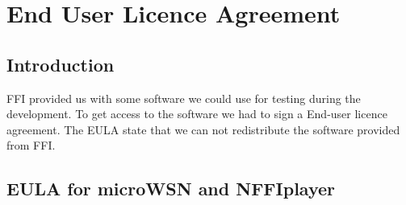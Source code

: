 \chapter{End User Licence Agreement}
\label{appendix-eula}

\section{Introduction}

FFI provided us with some software we could use for testing during the development. To get access to the software we had to sign a End-user licence agreement. The EULA state that we can not redistribute the software provided from FFI.

\section{EULA for microWSN and NFFIplayer}
